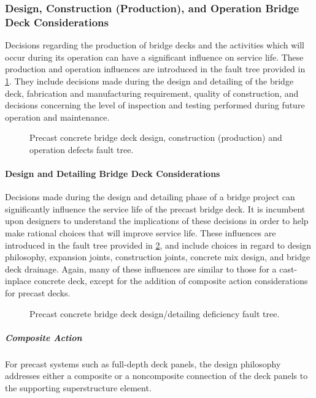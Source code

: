 \subsubsection{Design, Construction (Production), and Operation Bridge Deck Considerations}
Decisions regarding the production of bridge decks and the activities which will occur during its operation can
have a significant influence on service life. These production and operation influences are introduced in the fault tree
provided in \cref{fig:fault-tree-precast-deck-operation}. They include decisions made during the design and detailing of the bridge deck, fabrication
and manufacturing requirement, quality of construction, and decisions concerning the level of inspection and testing
performed during future operation and maintenance.

\begin{figure}
  \caption{Precast concrete bridge deck design, construction (production) and operation defects fault tree.}
  \label{fig:fault-tree-precast-deck-operation}
\end{figure}

\paragraph{Design and Detailing Bridge Deck Considerations}
Decisions made during the design and detailing phase of a bridge project can significantly influence the service
life of the precast bridge deck. It is incumbent upon designers to understand the implications of these decisions in
order to help make rational choices that will improve service life. These influences are introduced in the fault tree
provided in \cref{fig:fault-tree-precast-deck-design}, and include choices in regard to design philosophy, expansion joints, construction joints,
concrete mix design, and bridge deck drainage. Again, many of these influences are similar to those for a cast-inplace
concrete deck, except for the addition of composite action considerations for precast decks.

\begin{figure}
  \caption{Precast concrete bridge deck design/detailing deficiency fault tree.}\label{fig:fault-tree-precast-deck-design}
\end{figure}

\subparagraph*{Composite Action}
For precast systems such as full-depth deck panels, the design philosophy addresses either a composite or a noncomposite
connection of the deck panels to the supporting superstructure element.


